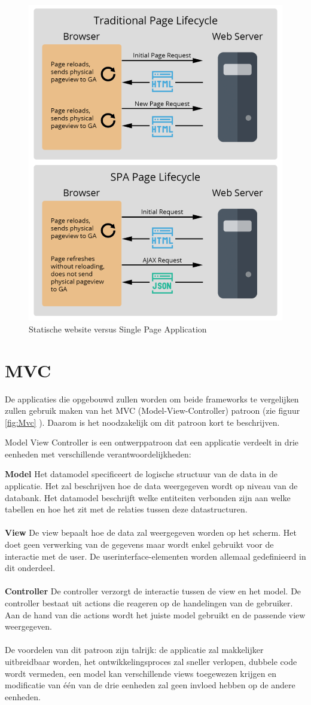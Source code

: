 \begin{figure}[H]
	\centering
	\includegraphics[width=0.5\linewidth]{spa-architecture}
	\caption{Statische website versus Single Page Application \autocite{E-nor2018}}
	\label{fig:SPA}
\end{figure}

\section{MVC}
De applicaties die opgebouwd zullen worden om beide frameworks te vergelijken zullen gebruik maken van het MVC (Model-View-Controller) patroon (zie figuur \ref{fig:Mvc} ). Daarom is het noodzakelijk om dit patroon kort te beschrijven.


Model View Controller is een ontwerppatroon dat een applicatie verdeelt in drie eenheden met verschillende verantwoordelijkheden:

	\textbf{Model}  \hspace{1cm} Het datamodel specificeert de logische structuur van de data in de applicatie. Het zal beschrijven hoe de data weergegeven wordt op niveau van de databank. Het datamodel beschrijft welke entiteiten verbonden zijn aan welke tabellen en hoe het zit met de relaties tussen deze datastructuren.   					\\ \\
	\textbf{View} \hspace{1cm} De view bepaalt hoe de data zal weergegeven worden op het scherm. Het doet geen verwerking van de gegevens maar wordt enkel gebruikt voor de interactie met de user. De userinterface-elementen worden allemaal gedefinieerd in dit onderdeel. 						\\	\\
	\textbf{Controller} \hspace{1cm} De controller verzorgt de interactie tussen de view en het model. De controller bestaat uit actions die reageren op de handelingen van de gebruiker. Aan de hand van die actions wordt het juiste model gebruikt en de passende view weergegeven.  			\\	\\
De voordelen van dit patroon zijn talrijk: de applicatie zal makkelijker uitbreidbaar worden, het ontwikkelingsproces zal sneller verlopen, dubbele code wordt vermeden, een model kan verschillende views toegewezen krijgen en modificatie van één van de drie eenheden zal geen invloed hebben op de andere eenheden.

